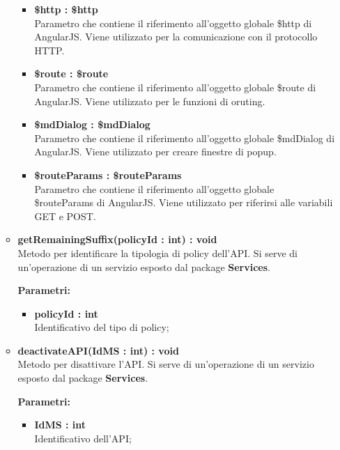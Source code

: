\begin{itemize}
\begin{itemize}
\begin{itemize}
			\item \textbf{\$http : \$http}\\
			Parametro che contiene il riferimento all'oggetto globale \$http di AngularJS. Viene utilizzato per la comunicazione con il protocollo HTTP.
			
			\item \textbf{\$route : \$route}\\
			Parametro che contiene il riferimento all'oggetto globale \$route di AngularJS. Viene utilizzato per le funzioni di oruting.
			
			\item \textbf{\$mdDialog : \$mdDialog}\\
			Parametro che contiene il riferimento all'oggetto globale \$mdDialog di AngularJS. Viene utilizzato per creare finestre di popup.
			
			\item \textbf{\$routeParams : \$routeParams}\\
			Parametro che contiene il riferimento all'oggetto globale \$routeParams di AngularJS. Viene utilizzato per riferirsi alle variabili GET e POST.
			
		\end{itemize}
		
		\item \textbf{getRemainingSuffix(policyId : int) : void}\\
		Metodo per identificare la tipologia di policy dell'API. Si serve di un'operazione di un servizio esposto dal package \textbf{Services}.
		\begin{description}
			\item[\textbf{Parametri:}]
		\end{description}
		\begin{itemize}
			\item \textbf{policyId : int}\\
			Identificativo del tipo di policy;
		\end{itemize}
		
		\item \textbf{deactivateAPI(IdMS : int) : void}\\
		Metodo per disattivare l'API. Si serve di un'operazione di un servizio esposto dal package \textbf{Services}.
		\begin{description}
			\item[\textbf{Parametri:}]
		\end{description}
		\begin{itemize}
			\item \textbf{IdMS : int}\\
			Identificativo dell'API;
		\end{itemize}
		

\end{itemize}
\end{itemize}
